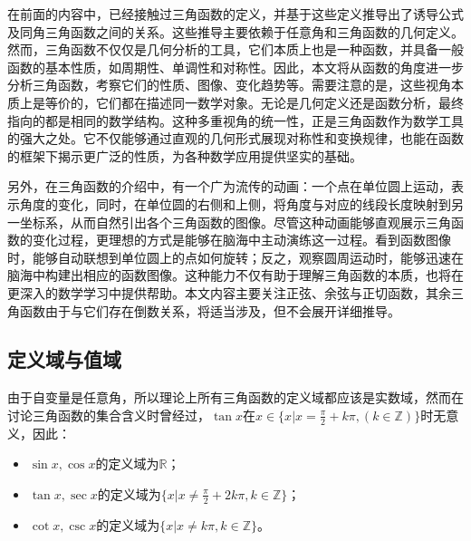 
\begin{issues}
\issueDraft
\end{issues}


在前面的内容中，已经接触过三角函数的定义，并基于这些定义推导出了诱导公式及同角三角函数之间的关系。这些推导主要依赖于任意角和三角函数的几何定义。然而，三角函数不仅仅是几何分析的工具，它们本质上也是一种函数，并具备一般函数的基本性质，如周期性、单调性和对称性。因此，本文将从函数的角度进一步分析三角函数，考察它们的性质、图像、变化趋势等。需要注意的是，这些视角本质上是等价的，它们都在描述同一数学对象。无论是几何定义还是函数分析，最终指向的都是相同的数学结构。这种多重视角的统一性，正是三角函数作为数学工具的强大之处。它不仅能够通过直观的几何形式展现对称性和变换规律，也能在函数的框架下揭示更广泛的性质，为各种数学应用提供坚实的基础。

另外，在三角函数的介绍中，有一个广为流传的动画：一个点在单位圆上运动，表示角度的变化，同时，在单位圆的右侧和上侧，将角度与对应的线段长度映射到另一坐标系，从而自然引出各个三角函数的图像。尽管这种动画能够直观展示三角函数的变化过程，更理想的方式是能够在脑海中主动演练这一过程。看到函数图像时，能够自动联想到单位圆上的点如何旋转；反之，观察圆周运动时，能够迅速在脑海中构建出相应的函数图像。这种能力不仅有助于理解三角函数的本质，也将在更深入的数学学习中提供帮助。本文内容主要关注正弦、余弦与正切函数，其余三角函数由于与它们存在倒数关系，将适当涉及，但不会展开详细推导。

\subsection{定义域与值域}

由于自变量是任意角，所以理论上所有三角函数的定义域都应该是实数域，然而在讨论三角函数的集合含义时曾经过，$\tan x$在$\displaystyle x\in\{x|x=\frac{\pi}{2}+k\pi,(k\in\mathbb{Z})\}$时无意义，因此：
\begin{itemize}
\item $\sin x,\cos x$的定义域为$\mathbb{R}$；
\item $\tan x,\sec x$的定义域为$\displaystyle\{x|x\neq\frac{\pi}{2}+2k\pi,k\in\mathbb{Z}\}$；
\item $\cot x,\csc x$的定义域为$\displaystyle\{x|x\neq k\pi,k\in\mathbb{Z}\}$。
\end{itemize}

